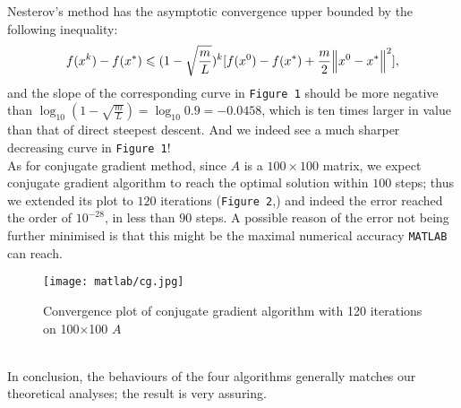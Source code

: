 \documentclass[11pt]{article}
\begin{document}
Nesterov's method has the asymptotic convergence upper bounded by the following inequality:
$$f(x^k)-f(x^*)\leqslant(1-\sqrt{\frac mL})^k[f(x^0)-f(x^*)+\frac m2\norm{x^0-x^*}^2],$$
and the slope of the corresponding curve in \texttt{Figure 1} should be more negative than $\log_{10}(1-\sqrt{\frac mL})=\log_{10}0.9=-0.0458$, which is ten times larger in value than that of direct steepest descent. And we indeed see a much sharper decreasing curve in \texttt{Figure 1}!\\[0.5cm]
As for conjugate gradient method, since $A$ is a $100\times100$ matrix, we expect conjugate gradient algorithm to reach the optimal solution within $100$ steps; thus we extended its plot to $120$ iterations (\texttt{Figure 2},) and indeed the error reached the order of $10^{-28}$, in less than $90$ steps. A possible reason of the error not being further minimised is that this might be the maximal numerical accuracy \texttt{MATLAB} can reach.
\begin{figure}[h]
\texttt{[image: matlab/cg.jpg]}
\caption{Convergence plot of conjugate gradient algorithm with 120 iterations on 100$\times$100 $A$}
\centering
\end{figure}\\
In conclusion, the behaviours of the four algorithms generally matches our theoretical analyses; the result is very assuring.
\end{document}
